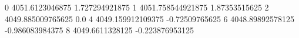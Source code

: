 0 4051.6123046875 1.727294921875
1 4051.758544921875 1.87353515625
2 4049.885009765625 0.0
4 4049.159912109375 -0.72509765625
6 4048.89892578125 -0.986083984375
8 4049.6611328125 -0.223876953125
